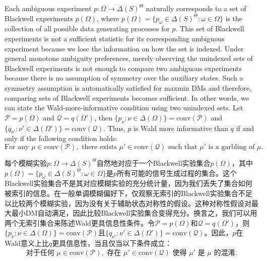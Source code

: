 \documentclass[12pt,a4paper]{article}
\newenvironment{original}
  {\par\vspace{4pt}\noindent\color{black}\ignorespaces}
  {\par\vspace{2pt}}
\newenvironment{translation}
  {\par\vspace{2pt}\noindent\color{myblue}\ignorespaces}
  {\par\vspace{6pt}}
\newcommand{\Delt}{\Delta}
\newcommand{\conv}{\mathrm{conv}}
\begin{document}
\begin{original}
Each ambiguous experiment $p:\Omega\to\Delt(S)^{\Theta}$ naturally corresponds to a set of Blackwell experiments $p(\Omega)$, where $p(\Omega)=\{p_{\omega}\in\Delt(S)^{\Theta}:\omega\in\Omega\}$ is the collection of all possible data generating processes for $p$. This set of Blackwell experiments is not a sufficient statistic for its corresponding ambiguous experiment because we lose the information on how the set is indexed. Under general monotone ambiguity preferences, merely observing the unindexed sets of Blackwell experiments is not enough to compare two ambiguous experiments because there is no assumption of symmetry over the auxiliary states. Such a symmetry assumption is automatically satisfied for maxmin DMs and therefore, comparing sets of Blackwell experiments becomes sufficient. In other words, we can state the Wald-more-informative condition using two unindexed sets. Let $\mathcal{P}=p(\Omega)$ and $\mathcal{Q}=q(\Omega')$, then $\{p_{\nu}:\nu\in\Delt(\Omega)\}=\conv(\mathcal{P})$ and $\{q_{\nu'}:\nu'\in\Delt(\Omega')\}=\conv(\mathcal{Q})$. Thus, $p$ is Wald more informative than $q$ if and only if the following condition holds:
\begin{equation}
    \text{For any } \mu\in\conv(\mathcal{P}), \text{ there exists } \mu'\in\conv(\mathcal{Q}) \text{ such that } \mu' \text{ is a garbling of } \mu. \tag{*}
\end{equation}
\end{original}

\begin{translation}
每个模糊实验$p:\Omega\to\Delt(S)^{\Theta}$自然地对应于一个Blackwell实验集合$p(\Omega)$，其中$p(\Omega)=\{p_{\omega}\in\Delt(S)^{\Theta}:\omega\in\Omega\}$是$p$所有可能的信号生成过程的集合。这个Blackwell实验集合不是其对应模糊实验的充分统计量，因为我们丢失了集合如何被索引的信息。在一般单调模糊偏好下，仅观察无索引的Blackwell实验集合不足以比较两个模糊实验，因为没有关于辅助状态对称性的假设。这种对称性假设对最大最小DM自动满足，因此比较Blackwell实验集合变得充分。换言之，我们可以用两个无索引集合来陈述Wald更具信息性条件。令$\mathcal{P}=p(\Omega)$和$\mathcal{Q}=q(\Omega')$，则$\{p_{\nu}:\nu\in\Delt(\Omega)\}=\conv(\mathcal{P})$且$\{q_{\nu'}:\nu'\in\Delt(\Omega')\}=\conv(\mathcal{Q})$。因此，$p$在Wald意义上比$q$更具信息性，当且仅当以下条件成立：
\begin{equation}
    \text{对于任何 } \mu\in\conv(\mathcal{P}), \text{ 存在 } \mu'\in\conv(\mathcal{Q}) \text{ 使得 } \mu' \text{ 是 } \mu \text{ 的混淆}. \tag{*}
\end{equation}
\end{translation}
\end{document}
